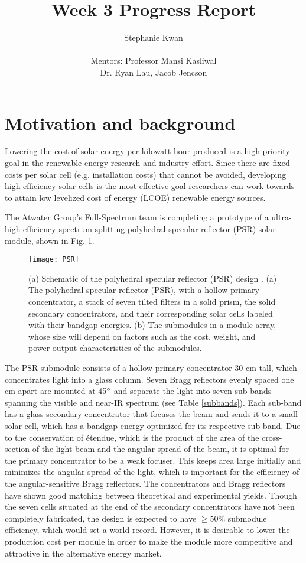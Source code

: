 \documentclass{article}
\title{Week 3 Progress Report}
\author{Stephanie Kwan \\
\\
Mentors: Professor Mansi Kasliwal \\
Dr. Ryan Lau, Jacob Jencson
}
\begin{document}
\maketitle
\renewcommand{\headrulewidth}{0.0pt}
\pagestyle{fancy}
\thispagestyle{fancy}
\chead{}

\section*{Motivation and background}
Lowering the cost of solar energy per kilowatt-hour produced is a high-priority goal in the renewable energy research and industry effort. Since there are fixed costs per solar cell (e.g. installation costs) that cannot be avoided, developing high efficiency solar cells is the most effective goal researchers can work towards to attain low levelized cost of energy (LCOE) renewable energy sources.

The Atwater Group's Full-Spectrum team is completing a prototype of a ultra-high efficiency spectrum-splitting polyhedral specular reflector (PSR) solar module, shown in Fig. \ref{PSR}.

\begin{figure}[h]
	\centering
	\texttt{[image: PSR]}
	\caption{(a) Schematic of the polyhedral specular reflector (PSR) design \cite{Eisler}. (a) The polyhedral specular reflector (PSR), with a hollow primary concentrator, a stack of seven tilted filters in a solid prism, the solid secondary concentrators, and their corresponding solar cells labeled with their bandgap energies. (b) The submodules in a module array, whose size will depend on factors such as the cost, weight, and power output characteristics of the submodules.}
	\label{PSR}
\end{figure}

The PSR submodule consists of a hollow primary concentrator 30 cm tall, which concentrates light into a glass column. Seven Bragg reflectors evenly spaced one cm apart are mounted at 45$\degree$ and separate the light into seven sub-bands spanning the visible and near-IR spectrum (see Table \ref{subbands}). Each sub-band has a glass secondary concentrator that focuses the beam and sends it to a small solar cell, which has a bandgap energy optimized for its respective sub-band. Due to the conservation of \'{e}tendue, which is the product of the area of the cross-section of the light beam and the angular spread of the beam, it is optimal for the primary concentrator to be a weak focuser. This keeps area large initially and minimizes the angular spread of the light, which is important for the efficiency of the angular-sensitive Bragg reflectors. The concentrators and Bragg reflectors have shown good matching between theoretical and experimental yields. Though the seven cells situated at the end of the secondary concentrators have not been completely fabricated, the design is expected to have $\geq$50\% submodule efficiency, which would set a world record. However, it is desirable to lower the production cost per module in order to make the module more competitive and attractive in the alternative energy market. 
\end{document}
